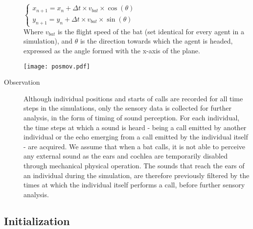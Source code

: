 \documentclass[12pt]{article}
\begin{document}
\begin{description}
\begin{math}
	\left\{
		\begin{array}{l}
			x_{n+1}=x_n+\Delta t\times v_{bat}\times\cos(\theta)\\
			y_{n+1}=y_n+\Delta t\times v_{bat}\times\sin(\theta)
		\end{array}
	\right.
\end{math}
\\

Where $v_{bat}$ is the flight speed of the bat (set identical for every agent in a simulation), and $\theta$ is the direction towards which the agent is headed, expressed as the angle formed with the x-axis of the plane.

\begin{center}
\texttt{[image: posmov.pdf]}
\label{posmov}
\end{center}

\item [Observation] Although individual positions and starts of calls are recorded for all time steps in the simulations, only the sensory data is collected for further analysis, in the form of timing of sound perception. For each individual, the time steps at which a sound is heard - being a call emitted by another individual or the echo emerging from a call emitted by the individual itself - are acquired. We assume that when a bat calls, it is not able to perceive any external sound as the ears and cochlea are temporarily disabled through mechanical physical operation. The sounds that reach the ears of an individual during the simulation, are therefore previously filtered by the times at which the individual itself performs a call, before further sensory analysis. 

\end{description}

\subsection{Initialization}
\label{subsec: init}
\end{document}
